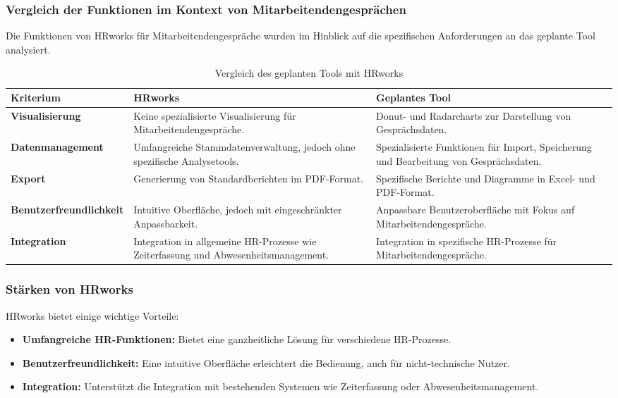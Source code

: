 \subsubsection{Vergleich der Funktionen im Kontext von Mitarbeitendengesprächen}
Die Funktionen von HRworks für Mitarbeitendengespräche wurden im Hinblick auf die spezifischen Anforderungen an das geplante Tool analysiert.

\begin{table}[h!]
\centering
\caption{Vergleich des geplanten Tools mit HRworks}
\label{tab:vergleich_hrworks}
\begin{tabularx}{\textwidth}{|X|X|X|}
\hline
\textbf{Kriterium}              & \textbf{HRworks}                                                                 & \textbf{Geplantes Tool}                                                          \\\hline
\textbf{Visualisierung}         & Keine spezialisierte Visualisierung für Mitarbeitendengespräche.                 & Donut- und Radarcharts zur Darstellung von Gesprächsdaten.                      \\\hline
\textbf{Datenmanagement}        & Umfangreiche Stammdatenverwaltung, jedoch ohne spezifische Analysetools.         & Spezialisierte Funktionen für Import, Speicherung und Bearbeitung von Gesprächsdaten. \\\hline
\textbf{Export}                 & Generierung von Standardberichten im PDF-Format.                                  & Spezifische Berichte und Diagramme in Excel- und PDF-Format.                    \\\hline
\textbf{Benutzerfreundlichkeit} & Intuitive Oberfläche, jedoch mit eingeschränkter Anpassbarkeit.                  & Anpassbare Benutzeroberfläche mit Fokus auf Mitarbeitendengespräche.            \\\hline
\textbf{Integration}            & Integration in allgemeine HR-Prozesse wie Zeiterfassung und Abwesenheitsmanagement. & Integration in spezifische HR-Prozesse für Mitarbeitendengespräche.             \\\hline
\end{tabularx}
\end{table}

\subsubsection{Stärken von HRworks}
HRworks bietet einige wichtige Vorteile:
\begin{itemize}
    \item \textbf{Umfangreiche HR-Funktionen:} Bietet eine ganzheitliche Lösung für verschiedene HR-Prozesse.
    \item \textbf{Benutzerfreundlichkeit:} Eine intuitive Oberfläche erleichtert die Bedienung, auch für nicht-technische Nutzer.
    \item \textbf{Integration:} Unterstützt die Integration mit bestehenden Systemen wie Zeiterfassung oder Abwesenheitsmanagement.
\end{itemize}

